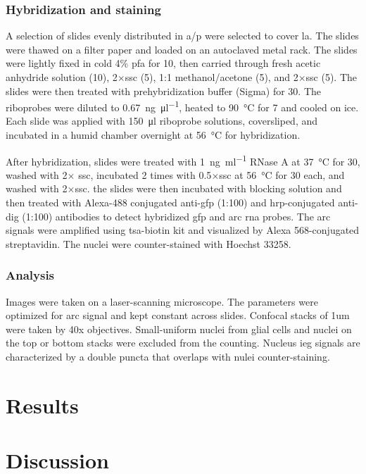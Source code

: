 \subsubsection{Hybridization and staining}
A selection of slides evenly distributed in \gls{a/p} were selected to cover \gls{la}. The slides were thawed on a filter paper and loaded on an autoclaved metal rack. The slides were lightly fixed in cold 4\% \gls{pfa} for \SI{10}{\min}, then carried through fresh acetic anhydride solution (\SI{10}{\min}), 2$\times$\gls{ssc} (\SI{5}{\min}), 1:1 methanol\slash acetone (\SI{5}{\min}), and 2$\times$\gls{ssc} (\SI{5}{\min}). The slides were then treated with prehybridization buffer (Sigma) for \SI{30}{\min}. The riboprobes were diluted to \SI{0.67}{\ng\per\ul}, heated to \SI{90}{\celsius} for \SI{7}{\min} and cooled on ice. Each slide was applied with \SI{150}{\ul} riboprobe solutions, coversliped, and incubated in a humid chamber overnight at \SI{56}{\celsius} for hybridization.

After hybridization, slides were treated with \SI{1}{\ng\per\ml} RNase A at \SI{37}{\celsius} for \SI{30}{\min}, washed with 2$\times$ \gls{ssc}, incubated 2 times with 0.5$\times$\gls{ssc} at \SI{56}{\celsius} for \SI{30}{\min} each, and washed with 2$\times$\gls{ssc}. the slides were then incubated with blocking solution and then treated with Alexa-488 conjugated anti-\gls{gfp} (1:100) and \gls{hrp}-conjugated anti-\gls{dig} (1:100) antibodies to detect hybridized \gls{gfp} and \gls{arc} \gls{rna} probes. The \gls{arc} signals were amplified using \gls{tsa}-biotin kit and visualized by Alexa 568-conjugated streptavidin. The nuclei were counter-stained with Hoechst 33258.

\subsubsection{Analysis}
Images were taken on a laser-scanning microscope. The parameters were optimized for \gls{arc} signal and kept constant across slides. Confocal stacks of 1um were taken by 40x objectives. Small-uniform nuclei from glial cells and nuclei on the top or bottom stacks were excluded from the counting. Nucleus \gls{ieg} signals are characterized by a double puncta that overlaps with nulei counter-staining. %

\section{Results}
\section{Discussion}
